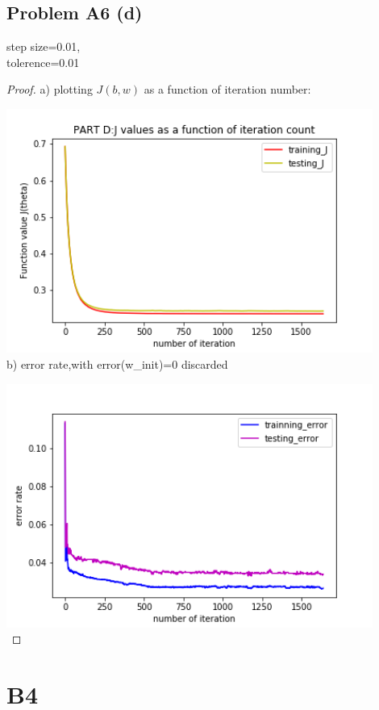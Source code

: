 \documentclass[12pt]{article}
\begin{document}
\subsection*{Problem A6 (d)}
step size=0.01, \\ tolerence=0.01\\
\begin{proof}
a) plotting $J(b,w)$ as a function of iteration number:

\includegraphics[width = 12cm, height = 8cm]{../code/A6_d_1.png}\\

b) error rate,with error(w\_init)=0 discarded 

\includegraphics[width = 12cm, height = 8cm]{../code/A6_d_2.png}\\

\end{proof}

 \newpage

 \section{B4}
\end{document}
